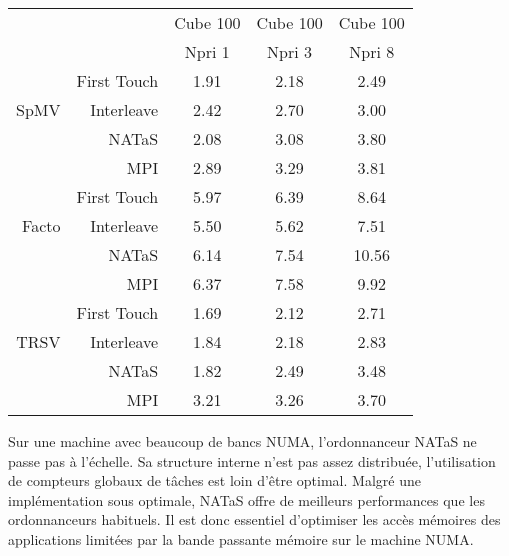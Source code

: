 \begin{center}
  \begin{tabular}{|r|r|c|c|c|}
    \hline
       & & Cube 100 & Cube 100 & Cube 100 \\
       & & Npri 1   & Npri 3   & Npri 8 \\
    \hline
&        First Touch &	1.91 &	2.18 &	2.49 \\
SpMV &   Interleave  &	2.42 &	2.70 &	3.00 \\
&        NATaS       &	2.08 &	3.08 &	3.80 \\
&        MPI         &	2.89 &	3.29 &	3.81 \\
    \hline
&        First Touch &	5.97 &	6.39 &	8.64 \\
Facto &  Interleave  &	5.50 &	5.62 &	7.51 \\
&        NATaS       &	6.14 &	7.54 &	10.56 \\
&        MPI         &	6.37 &	7.58 &	9.92 \\
    \hline
&        First Touch &	1.69 &	2.12 &	2.71 \\
TRSV &   Interleave  &	1.84 &	2.18 &	2.83 \\
&        NATaS       &	1.82 &	2.49 &	3.48 \\
&        MPI         &	3.21 &	3.26 &	3.70 \\
    \hline
  \end{tabular}
  \label{tab:rostand_sum}
\end{center}


Sur une machine avec beaucoup de bancs NUMA, l'ordonnanceur NATaS ne passe pas à l'échelle.
%
Sa structure interne n'est pas assez distribuée, l'utilisation de compteurs globaux de tâches est loin d'être optimal.
%
Malgré une implémentation sous optimale, NATaS offre de meilleurs performances que les ordonnanceurs habituels.
%
Il est donc essentiel d'optimiser les accès mémoires des applications limitées par la bande passante mémoire sur le machine NUMA.
